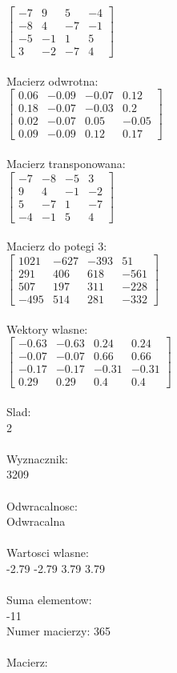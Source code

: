 \documentclass[a4paper,12pt]{article}
\begin{document}
$\begin{bmatrix} -7&9&5&-4\\-8&4&-7&-1\\-5&-1&1&5\\3&-2&-7&4 \end{bmatrix}$
\\
\\
Macierz odwrotna:\\

$\begin{bmatrix} 0.06&-0.09&-0.07&0.12\\0.18&-0.07&-0.03&0.2\\0.02&-0.07&0.05&-0.05\\0.09&-0.09&0.12&0.17 \end{bmatrix}$
\\
\\
Macierz transponowana:\\

$\begin{bmatrix} -7&-8&-5&3\\9&4&-1&-2\\5&-7&1&-7\\-4&-1&5&4 \end{bmatrix}$
\\
\\
Macierz do potegi 3:\\

$\begin{bmatrix} 1021&-627&-393&51\\291&406&618&-561\\507&197&311&-228\\-495&514&281&-332 \end{bmatrix}$
\\
\\
Wektory wlasne:\\

$\begin{bmatrix} -0.63&-0.63&0.24&0.24\\-0.07&-0.07&0.66&0.66\\-0.17&-0.17&-0.31&-0.31\\0.29&0.29&0.4&0.4 \end{bmatrix}$
\\
\\
Slad:\\
2
\\
\\
Wyznacznik:\\
3209
\\
\\
Odwracalnosc:\\
Odwracalna
\\
\\
Wartosci wlasne:\\
-2.79 -2.79 3.79 3.79
\\
\\
Suma elementow:\\
-11
\\
\newpage
Numer macierzy:
365
\\
\\
Macierz:\\
\end{document}

